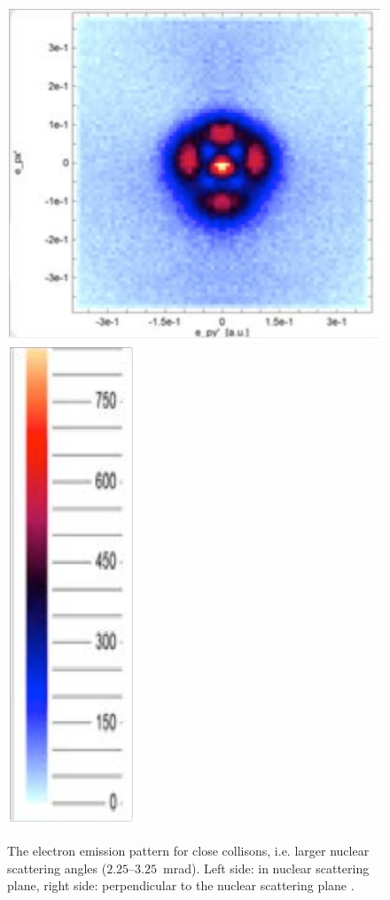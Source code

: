 \documentclass[12pt]{article}
\begin{document}
\begin{figure}
\begin{center}
\includegraphics[scale=0.4]{figures/HeExp_results2c}
\includegraphics[scale=0.4]{figures/HeExp_results2d}
\caption{The electron emission pattern for close collisons, i.e. larger nuclear scattering angles ($2.25$--$3.25$~mrad). Left side: in nuclear scattering plane, right side: perpendicular to the nuclear scattering plane \citep{SchmidtLEtal2014Vortices}.}
\label{fig:HeExp_results2}
\end{center}
\end{figure}
\end{document}

